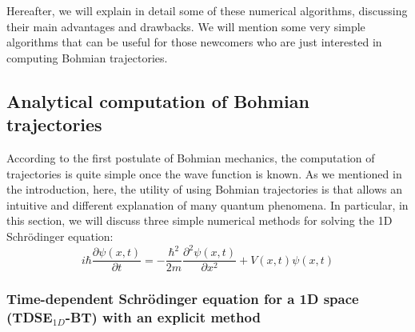 \documentclass[onecolumn,nofootinbib, secnumarabic, amsmath, nobibnotes,11pt,aps,pra]{revtex4-1}
\begin{document}
Hereafter, we will explain in detail some of these numerical
algorithms, discussing their main advantages and drawbacks. We will
mention some very simple algorithms that can be useful for those
newcomers who are just interested in computing Bohmian trajectories.\enlargethispage{-1pc}


\subsection{Analytical computation of Bohmian trajectories}

According to the first postulate of Bohmian mechanics, the
computation of trajectories is quite simple once the wave function
is known.  As we mentioned in the introduction, here, the utility of
using Bohmian trajectories is that allows an intuitive and different
explanation of many quantum phenomena. In particular, in this
section, we will discuss three simple numerical methods for
solving the 1D Schr\"odinger equation:
\begin{equation}
\label{om.Schrodinger1Dappendix}
i \hbar \frac{\partial \psi(x,t)} {\partial t} = -\frac {\hbar^2} {2m} \frac{ {\partial}^2 \psi(x,t)} {\partial x^2} + V(x,t) \psi(x,t)
\end{equation}

\subsubsection{Time-dependent Schr\"odinger equation for a 1D space (TDSE$_{1D}$-BT) with an explicit method}
\label{timedependentexplicit}
\end{document}
